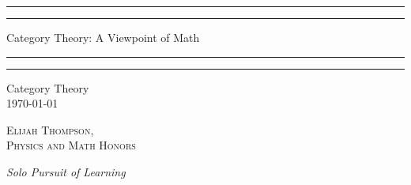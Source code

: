 \documentclass[12pt, a4paper, oneside, openright, titlepage]{book}
\begin{document}

\begin{titlepage}
    \centering
    \scshape
    \vspace*{\baselineskip}
    \rule{\textwidth}{1.6pt}\vspace*{-\baselineskip}\vspace*{2pt}
    \rule{\textwidth}{0.4pt}
    
    \vspace{0.75\baselineskip}
    
    {\LARGE Category Theory: A Viewpoint of Math}
    
    \vspace{0.75\baselineskip}
    
    \rule{\textwidth}{0.4pt}\vspace*{-\baselineskip}\vspace{3.2pt}
    \rule{\textwidth}{1.6pt}
    
    \vspace{2\baselineskip}
    Category Theory \\
    \vspace*{3\baselineskip}
    \monthdayyeardate\today \\
    \vspace*{5.0\baselineskip}
    
    {\scshape\Large Elijah Thompson, \\ Physics and Math Honors\\}
    
    \vspace{1.0\baselineskip}
    \textit{Solo Pursuit of Learning}
    \vfill
    \enlargethispage{1in}
    \begin{figure}[b!]
    \end{figure}
\end{titlepage}
\end{document}

